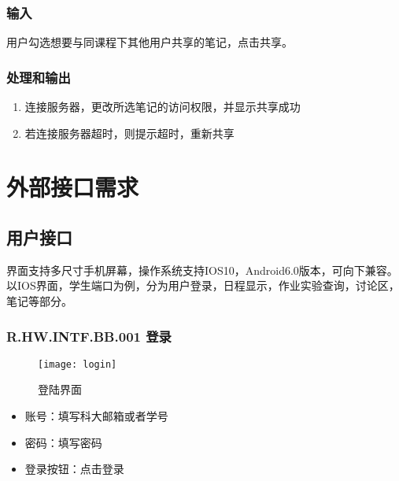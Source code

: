     \subsubsection{输入}
	   用户勾选想要与同课程下其他用户共享的笔记，点击共享。
    \subsubsection{处理和输出}
    \begin{enumerate}
      \item 连接服务器，更改所选笔记的访问权限，并显示共享成功
      \item 若连接服务器超时，则提示超时，重新共享
    \end{enumerate}

\section{外部接口需求}
  \subsection{用户接口}
  界面支持多尺寸手机屏幕，操作系统支持IOS10，Android6.0版本，可向下兼容。\\
  以IOS界面，学生端口为例，分为用户登录，日程显示，作业实验查询，讨论区，笔记等部分。
    \subsubsection{R.HW.INTF.BB.001 登录}
    \begin{figure}[H]
    \centering
    \texttt{[image: login]}
    \caption{登陆界面}
    \end{figure}
    \begin{itemize}
      \item 账号：填写科大邮箱或者学号
      \item 密码：填写密码
      \item 登录按钮：点击登录
    \end{itemize}
